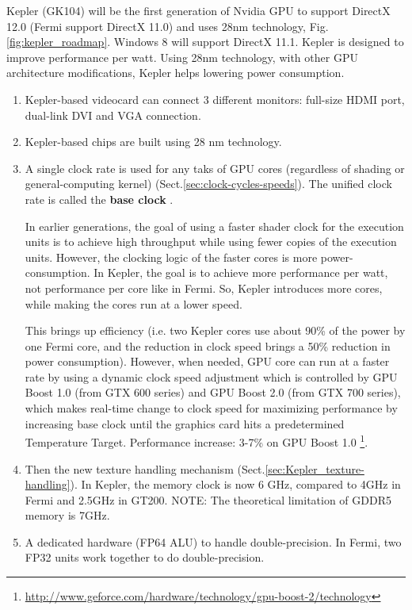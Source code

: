 Kepler (GK104) will be the first generation of Nvidia GPU to support DirectX
12.0 (Fermi support DirectX 11.0) and uses 28nm technology,
Fig.\ref{fig:kepler_roadmap}. Windows 8 will support DirectX 11.1.
Kepler is designed to improve performance per watt. Using 28nm technology, with
other GPU architecture modifications, Kepler helps lowering power consumption.
\begin{enumerate}
  \item Kepler-based videocard can connect 3 different monitors:
  full-size HDMI port, dual-link DVI and VGA connection.

  \item Kepler-based chips are built using 28 nm technology.

  \item A single clock rate is used for any taks of GPU cores (regardless of
  shading or general-computing kernel) (Sect.\ref{sec:clock-cycles-speeds}). 
  The unified clock rate is called the {\bf base clock} .
  
  In earlier generations, the goal of using a faster shader clock for the
  execution units is to achieve high throughput while using fewer copies of the
  execution units. However, the clocking logic of the faster cores is more
  power-consumption. In Kepler, the goal is to achieve more performance per
  watt, not performance per core like in Fermi. So, Kepler introduces more
  cores, while making the cores run at a lower speed.
  
  This brings up efficiency (i.e. two Kepler cores use about 90\% of the power
  by one Fermi core, and the reduction in clock speed brings a 50\% reduction in
  power consumption). However, when needed, GPU core can run at a faster rate by
  using a dynamic clock speed adjustment which is controlled by GPU Boost 1.0
  (from GTX 600 series) and GPU Boost 2.0 (from GTX 700 series), which makes
  real-time change to clock speed for maximizing performance by increasing base
  clock until the graphics card hits a predetermined Temperature Target.
  Performance increase: 3-7\% on GPU Boost 1.0
  \footnote{\url{http://www.geforce.com/hardware/technology/gpu-boost-2/technology}}.

  \item Then the new texture handling mechanism
  (Sect.\ref{sec:Kepler_texture-handling}). In Kepler, the memory clock is now 6
  GHz, compared to 4GHz in Fermi and 2.5GHz in GT200. NOTE: The theoretical
  limitation of GDDR5 memory is 7GHz.

  \item A dedicated hardware (FP64 ALU) to handle double-precision. In Fermi,
  two FP32 units work together to do double-precision.
    

\end{enumerate}
